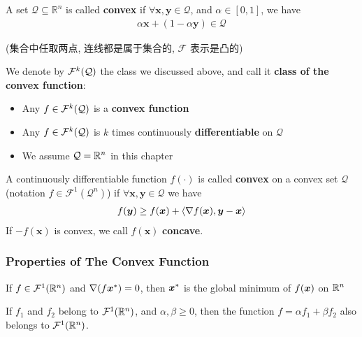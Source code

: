 \begin{definition}
    A set $\mathcal{Q}\subseteq \mathbb{R}^n$ is called \textbf{convex} if $\forall \bm x,\bm y\in \mathcal{Q}$, and $\alpha \in [0,1]$, we have
    \begin{align*}
        \alpha \bm x+(1-\alpha \bm y)\in \mathcal{Q}
    \end{align*}
\end{definition}
(集合中任取两点, 连线都是属于集合的, $\mathcal{F}$ 表示是凸的)

We denote by $\mathcal{F}^k(\mathcal{Q})$ the class we discussed above, and call it \textbf{class of the convex function}:
\begin{itemize}
    \item Any $f\in\mathcal{F}^k(\mathcal{Q})$ is a \textbf{convex function}
    \item Any $f\in\mathcal{F}^k(\mathcal{Q})$ is $k$ times continuously \textbf{differentiable} on $\mathcal{Q}$
    \item We assume $\mathcal{Q}=\mathbb{R}^n$ in this chapter
\end{itemize}

\begin{definition}
    A continuously differentiable function $f(\cdot)$ is called \textbf{convex} on a convex set $\mathcal{Q}$ (notation $f\in \mathcal{F}^1(\mathcal{Q}^n)$) if $\forall \bm x,\bm y\in \mathcal{Q}$ we have
    \begin{align*}
        f(\bm y)\ge f(\bm x)+\braket{\nabla f(\bm x),\bm y-\bm x}
    \end{align*}
    If $-f(\bm x)$ is convex, we call $f(\bm x)$ \textbf{concave}. 
\end{definition}

\subsubsection{Properties of The Convex Function}

\begin{theorem}
    If $f\in\mathcal{F}^1(\mathbb{R}^n)$ and $\nabla(f\bm{x}^*)=0$, then $\bm{x}^*$ is the global minimum of $f(\bm{x})$ on $\mathbb{R}^n$
\end{theorem}

\begin{lemma}
    If $f_1$ and $f_2$ belong to $\mathcal{F}^1(\mathbb{R}^n)$, and $\alpha, \beta \ge 0$, then the function $f=\alpha f_1+\beta f_2$ also belongs to $\mathcal{F}^1(\mathbb{R}^n)$. 
\end{lemma}

